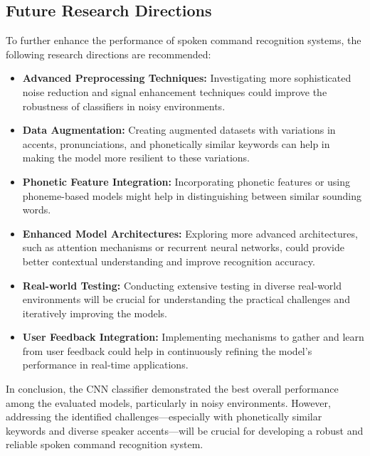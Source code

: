 \subsection{Future Research Directions}
To further enhance the performance of spoken command recognition systems, the following research directions are recommended:

\begin{itemize}
    \item \textbf{Advanced Preprocessing Techniques:} Investigating more sophisticated noise reduction and signal enhancement techniques could improve the robustness of classifiers in noisy environments.

    \item \textbf{Data Augmentation:} Creating augmented datasets with variations in accents, pronunciations, and phonetically similar keywords can help in making the model more resilient to these variations.

    \item \textbf{Phonetic Feature Integration:} Incorporating phonetic features or using phoneme-based models might help in distinguishing between similar sounding words.

    \item \textbf{Enhanced Model Architectures:} Exploring more advanced architectures, such as attention mechanisms or recurrent neural networks, could provide better contextual understanding and improve recognition accuracy.

    \item \textbf{Real-world Testing:} Conducting extensive testing in diverse real-world environments will be crucial for understanding the practical challenges and iteratively improving the models.

    \item \textbf{User Feedback Integration:} Implementing mechanisms to gather and learn from user feedback could help in continuously refining the model's performance in real-time applications.
\end{itemize}

In conclusion, the CNN classifier demonstrated the best overall performance among the evaluated models, particularly in noisy environments. However, addressing the identified challenges—especially with phonetically similar keywords and diverse speaker accents—will be crucial for developing a robust and reliable spoken command recognition system.
